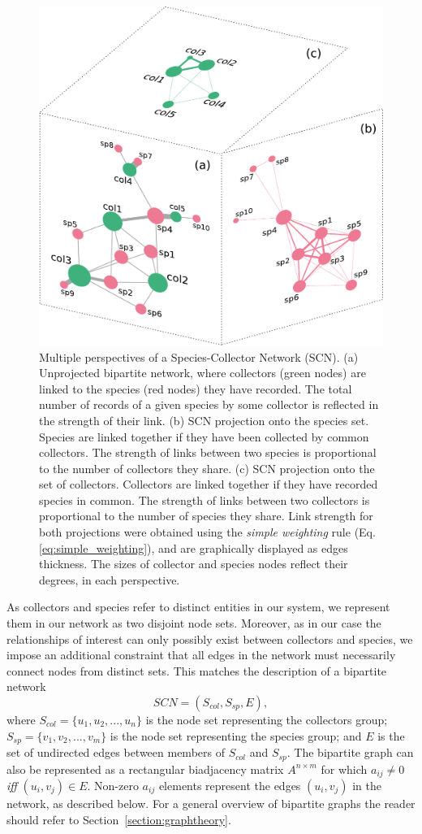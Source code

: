 {  \begin{figure}[h!]
  	\centering
    \includegraphics[width=.7\linewidth]{figures/network_models/scn_generalaspect.pdf}
    \caption[General aspect of a Species-Collector Network (SCN)]{Multiple perspectives of a Species-Collector Network (SCN).
    (a) Unprojected bipartite network, where collectors (green nodes) are linked to the species (red nodes) they have recorded. The total number of records of a given species by some collector is reflected in the strength of their link. (b) SCN projection onto the species set. Species are linked together if they have been collected by common collectors. The strength of links between two species is proportional to the number of collectors they share. (c) SCN projection onto the set of collectors. Collectors are linked together if they have recorded species in common. The strength of links between two collectors is proportional to the number of species they share. 
    Link strength for both projections were obtained using the \textit{simple weighting} rule (Eq. \ref{eq:simple_weighting}), and are graphically displayed as edges thickness. The sizes of collector and species nodes reflect their degrees, in each perspective.}
    \label{fig:scn_general}
  \end{figure}
  
As collectors and species refer to distinct entities in our system, we represent them in our network as two disjoint node sets.
Moreover, as in our case the relationships of interest can only possibly exist between collectors and species, we impose an additional constraint that all edges in the network must necessarily connect nodes from distinct sets.
This matches the description of a bipartite network
$$ SCN = (S_{col},S_{sp},E),$$
where $S_{col} = \{u_1, u_2, ..., u_n \}$ is the node set representing the collectors group; $S_{sp}=\{v_1,v_2, ..., v_m\}$ is the node set representing the species group; and $E$ is the set of undirected edges between members of $S_{col}$ and $S_{sp}$.
The bipartite graph can also be represented as a rectangular biadjacency matrix $A^{n\times m}$ for which $a_{ij}\neq 0$ \textit{iff} $(u_i,v_j) \in E$. 
Non-zero $a_{ij}$ elements represent the edges $(u_i,v_j)$ in the network, as described below. 
For a general overview of bipartite graphs the reader should refer to Section~\ref{section:graphtheory}.
  
}
